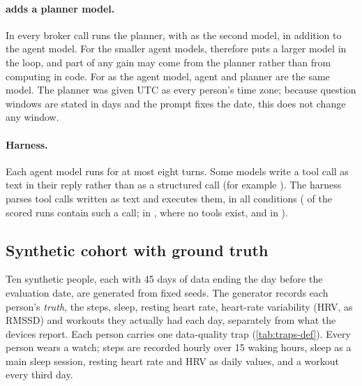 \paragraph{\CC{} adds a planner model.} In \CC{} every broker call runs the planner,  with
 as the second model, in addition to the agent model. For the smaller agent models, \CC{} therefore
puts a larger model in the loop, and part of any gain may come from the planner rather than from computing in code.
For  as the agent model, agent and planner are the same model. The planner was given UTC as
every person's time zone; because question windows are stated in days and the prompt fixes the date, this does not
change any window.

\paragraph{Harness.} Each agent model runs for at most eight turns. Some models write a tool call as text in their
reply rather than as a structured call (for example \code{[get\_daily(metric=steps, start=...)]}). The harness
parses tool calls written as text and executes them, in all conditions (\textRecoveredB{} of the scored \CB{} runs
contain such a call; \textRecoveredA{} in \CA{}, where no tools exist, and \textRecoveredC{} in \CC{}).

\subsection{Synthetic cohort with ground truth}\label{sec:cohort}

Ten synthetic people, each with 45 days of data ending the day before the evaluation date, are generated from fixed
seeds. The generator records each person's \emph{truth}, the steps, sleep, resting heart rate, heart-rate
variability (HRV, as RMSSD) and workouts they actually had each day, separately from what the devices report. Each person
carries one data-quality trap (\cref{tab:traps-def}). Every person wears a watch; steps are recorded hourly over 15
waking hours, sleep as a main sleep session, resting heart rate and HRV as daily values, and a workout every third
day.

